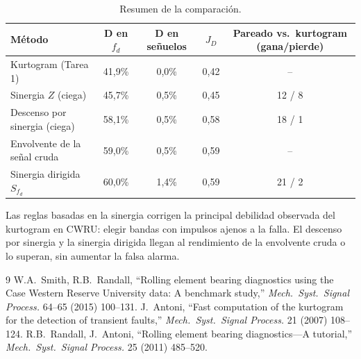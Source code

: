 \documentclass[11pt,a4paper]{article}
\begin{document}
\begin{table}[H]\centering\small
\begin{tabular}{@{}lcccc@{}}\toprule
Método & D en $f_d$ & D en señuelos & $J_D$ & Pareado vs.\ kurtogram (gana/pierde)\\\midrule
Kurtogram (Tarea 1) & 41{,}9\% & 0{,}0\% & 0{,}42 & --\\
Sinergia $Z$ (ciega) & 45{,}7\% & 0{,}5\% & 0{,}45 & 12 / 8\\
Descenso por sinergia (ciega) & 58{,}1\% & 0{,}5\% & 0{,}58 & 18 / 1\\
Envolvente de la señal cruda & 59{,}0\% & 0{,}5\% & 0{,}59 & --\\
Sinergia dirigida $S_{f_d}$ & 60{,}0\% & 1{,}4\% & 0{,}59 & 21 / 2\\
\bottomrule\end{tabular}
\caption{Resumen de la comparación.}\end{table}

\noindent Las reglas basadas en la sinergia corrigen la principal debilidad observada del kurtogram en CWRU: elegir bandas con impulsos ajenos a la falla. El descenso por sinergia y la sinergia dirigida llegan al rendimiento de la envolvente cruda o lo superan, sin aumentar la falsa alarma.

\begin{thebibliography}{9}\small
{} W.A.~Smith, R.B.~Randall, ``Rolling element bearing diagnostics using the Case Western Reserve University data: A benchmark study,'' \emph{Mech.\ Syst.\ Signal Process.} 64--65 (2015) 100--131.
 J.~Antoni, ``Fast computation of the kurtogram for the detection of transient faults,'' \emph{Mech.\ Syst.\ Signal Process.} 21 (2007) 108--124.
 R.B.~Randall, J.~Antoni, ``Rolling element bearing diagnostics---A tutorial,'' \emph{Mech.\ Syst.\ Signal Process.} 25 (2011) 485--520.
\end{thebibliography}
\end{document}
